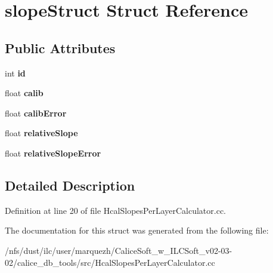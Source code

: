 \section{slope\-Struct Struct Reference}
\label{structslopeStruct}
\subsection*{Public Attributes}
\begin{DoxyCompactItemize}
\item 
int {\bfseries id}\label{structslopeStruct_ad71a3bb481c5f47380ddbbdf5b5042e3}

\item 
float {\bfseries calib}\label{structslopeStruct_a5a7227374a824eccdeb55bb4006bddff}

\item 
float {\bfseries calib\-Error}\label{structslopeStruct_a0a0c951def9045453f543f077f1879a8}

\item 
float {\bfseries relative\-Slope}\label{structslopeStruct_ab27f75ceb2fd2dc358d0733b2cfb5f8d}

\item 
float {\bfseries relative\-Slope\-Error}\label{structslopeStruct_a4fd2eacc2a7e13ecb52ced63ec46766e}

\end{DoxyCompactItemize}


\subsection{Detailed Description}


Definition at line 20 of file Hcal\-Slopes\-Per\-Layer\-Calculator.\-cc.



The documentation for this struct was generated from the following file\-:\begin{DoxyCompactItemize}
\item 
/nfs/dust/ilc/user/marquezh/\-Calice\-Soft\-\_\-w\-\_\-\-I\-L\-C\-Soft\-\_\-v02-\/03-\/02/calice\-\_\-db\-\_\-tools/src/Hcal\-Slopes\-Per\-Layer\-Calculator.\-cc\end{DoxyCompactItemize}
